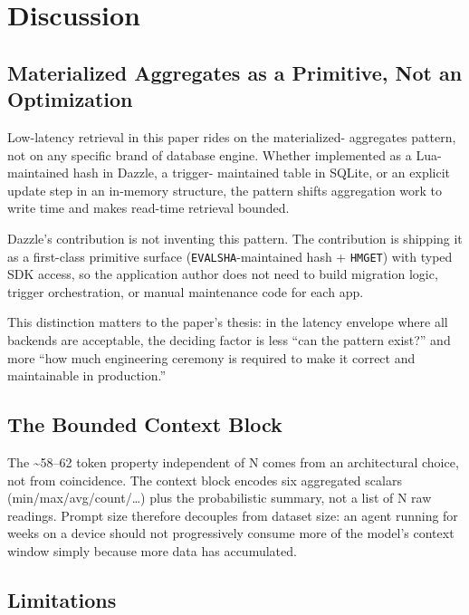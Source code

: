 \section{Discussion}\label{discussion}

\subsection{Materialized Aggregates as a Primitive, Not an
Optimization}\label{materialized-aggregates-as-a-primitive-not-an-optimization}

Low-latency retrieval in this paper rides on the materialized- aggregates
pattern, not on any specific brand of database engine. Whether implemented as a
Lua-maintained hash in Dazzle, a trigger- maintained table in SQLite, or an
explicit update step in an in-memory structure, the pattern shifts aggregation
work to write time and makes read-time retrieval bounded.

Dazzle's contribution is not inventing this pattern. The contribution is
shipping it as a first-class primitive surface (\texttt{EVALSHA}-maintained hash
+ \texttt{HMGET}) with typed SDK access, so the application author does not need
to build migration logic, trigger orchestration, or manual maintenance code for
each app.

This distinction matters to the paper's thesis: in the latency envelope where
all backends are acceptable, the deciding factor is less ``can the pattern
exist?'' and more ``how much engineering ceremony is required to make it correct
and maintainable in production.''

\subsection{The Bounded Context Block}\label{the-bounded-context-block}

The \textasciitilde58--62 token property independent of N comes from an
architectural choice, not from coincidence. The context block encodes six
aggregated scalars (min/max/avg/count/\ldots) plus the probabilistic summary,
not a list of N raw readings. Prompt size therefore decouples from dataset size:
an agent running for weeks on a device should not progressively consume more of
the model's context window simply because more data has accumulated.

\subsection{Limitations}\label{limitations}

